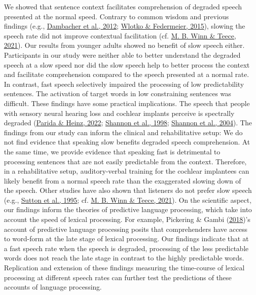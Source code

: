 \documentclass[a4paper, nobind]{templates/ociamthesis}
\begin{document}
We showed that sentence context facilitates comprehension of degraded speech presented at the normal speed.
Contrary to common wisdom and previous findings (e.g., \protect\hyperlink{ref-Dambacher2012}{Dambacher et al., 2012}; \protect\hyperlink{ref-Wlotko2015}{Wlotko \& Federmeier, 2015}), slowing the speech rate did not improve contextual facilitation (cf. \protect\hyperlink{ref-Winn2021}{M. B. Winn \& Teece, 2021}).
Our results from younger adults showed no benefit of slow speech either.
Participants in our study were neither able to better understand the degraded speech at a slow speed
nor did the slow speech help to better process the context and facilitate comprehension compared to the speech presented at a normal rate.
In contrast, fast speech selectively impaired the processing of low predictability sentences.
The activation of target words in low constraining sentences was difficult.
These findings have some practical implications.
The speech that people with sensory neural hearing loss and cochlear implants perceive is spectrally degraded (\protect\hyperlink{ref-Parida2022}{Parida \& Heinz, 2022}; \protect\hyperlink{ref-Shannon1998}{Shannon et al., 1998}; \protect\hyperlink{ref-Shannon2004}{Shannon et al., 2004}).
The findings from our study can inform the clinical and rehabilitative setup:
We do not find evidence that speaking slow benefits degraded speech comprehension.
At the same time, we provide evidence that speaking fast is detrimental to processing sentences that are not easily predictable from the context.
Therefore, in a rehabilitative setup, auditory-verbal training for the cochlear implantees can likely benefit from a normal speech rate than the exaggerated slowing down of the speech.
Other studies have also shown that listeners do not prefer slow speech (e.g., \protect\hyperlink{ref-Sutton1995}{Sutton et al., 1995}; cf. \protect\hyperlink{ref-Winn2021}{M. B. Winn \& Teece, 2021}).
On the scientific aspect,
our findings inform the theories of predictive language processing, which take into account the speed of lexical processing.
For example, Pickering \& Gambi (\protect\hyperlink{ref-Pickering2018}{2018})'s account of predictive language processing posits that comprehenders have access to word-form at the late stage of lexical processing.
Our findings indicate that at a fast speech rate when the speech is degraded, processing of the less predictable words does not reach the late stage in contrast to the highly predictable words.
Replication and extension of these findings measuring the time-course of lexical processing at different speech rates can further test the predictions of these accounts of language processing.
\end{document}

